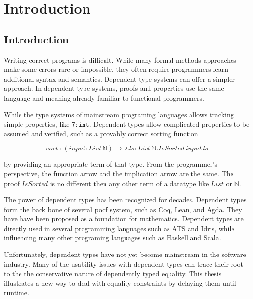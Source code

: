\chapter{Introduction}
\label{chapter:Introduction}
\thispagestyle{myheadings}

\section{Introduction} %

Writing correct programs is difficult. While many formal methods approaches make some errors rare or impossible, they often require programmers learn additional syntax and semantics.
Dependent type systems can offer a simpler approach. In dependent type systems, proofs and properties use the same language and meaning already familiar to functional programmers.

While the type systems of mainstream programing languages allows tracking simple properties, like $\mathtt{7:int}$.
Dependent types allow complicated properties to be assumed and verified, such as a provably correct sorting function 

\[
sort\,:\,\left(input:List\,\mathbb{N}\right)\rightarrow\Sigma ls:List\,\mathbb{N}.IsSorted\,input\,ls
\]

by providing an appropriate term of that type. From the programmer's perspective, the function arrow and the implication arrow are the same.
The proof $IsSorted$ is no different then any other term of a datatype like $List$ or $\mathbb{N}$. 

The power of dependent types has been recognized for decades.
Dependent types form the back bone of several poof system, such as Coq\cite{Coq12}, Lean\cite{10.1007/978-3-030-79876-5_37}, and Agda\cite{norell2007towards}.
They have have been proposed as a foundation for mathematics\cite{Martin-Lof-1972,HoTTbook}.
Dependent types are directly used in several programming languages such as ATS\cite{DependentMLAnapproachtopracticalprogrammingwithdependenttypes} and Idris\cite{brady2013idris}, while influencing many other programing languages such as Haskell and Scala.

Unfortunately, dependent types have not yet become mainstream in the software industry.
Many of the usability issues with dependent types can trace their root to the the conservative nature of dependently typed equality.
This thesis illustrates a new way to deal with equality constraints by delaying them until runtime.

